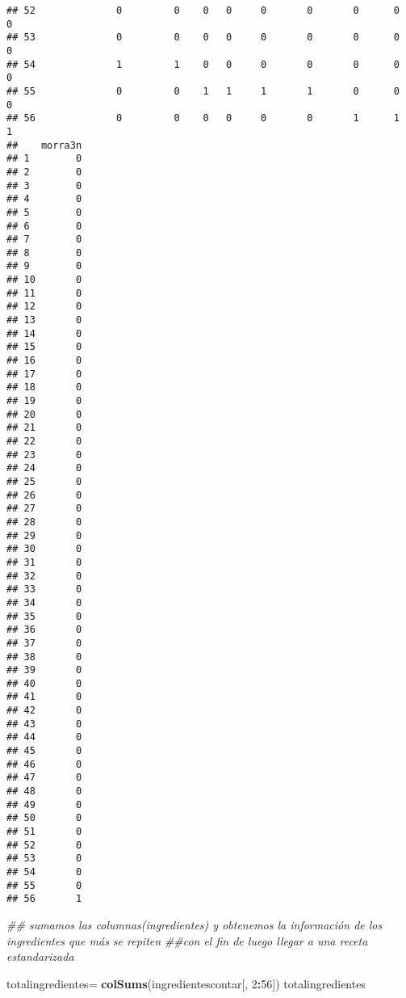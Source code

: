 \documentclass[
]{article}
\newenvironment{Shaded}{\begin{snugshade}}{\end{snugshade}}
\newcommand{\CommentTok}[1]{\textcolor[rgb]{0.56,0.35,0.01}{\textit{#1}}}
\newcommand{\DecValTok}[1]{\textcolor[rgb]{0.00,0.00,0.81}{#1}}
\newcommand{\KeywordTok}[1]{\textcolor[rgb]{0.13,0.29,0.53}{\textbf{#1}}}
\newcommand{\NormalTok}[1]{#1}
\newcommand{\OperatorTok}[1]{\textcolor[rgb]{0.81,0.36,0.00}{\textbf{#1}}}
\newcommand{\StringTok}[1]{\textcolor[rgb]{0.31,0.60,0.02}{#1}}
\begin{document}
\begin{verbatim}
## 52              0         0    0   0     0       0       0      0        0
## 53              0         0    0   0     0       0       0      0        0
## 54              1         1    0   0     0       0       0      0        0
## 55              0         0    1   1     1       1       0      0        0
## 56              0         0    0   0     0       0       1      1        1
##    morra3n
## 1        0
## 2        0
## 3        0
## 4        0
## 5        0
## 6        0
## 7        0
## 8        0
## 9        0
## 10       0
## 11       0
## 12       0
## 13       0
## 14       0
## 15       0
## 16       0
## 17       0
## 18       0
## 19       0
## 20       0
## 21       0
## 22       0
## 23       0
## 24       0
## 25       0
## 26       0
## 27       0
## 28       0
## 29       0
## 30       0
## 31       0
## 32       0
## 33       0
## 34       0
## 35       0
## 36       0
## 37       0
## 38       0
## 39       0
## 40       0
## 41       0
## 42       0
## 43       0
## 44       0
## 45       0
## 46       0
## 47       0
## 48       0
## 49       0
## 50       0
## 51       0
## 52       0
## 53       0
## 54       0
## 55       0
## 56       1
\end{verbatim}

\begin{Shaded}
\begin{Highlighting}[]
\CommentTok{## sumamos las columnas(ingredientes) y obtenemos la información de los ingredientes que más se repiten}
\CommentTok{##con el fin de luego llegar a una receta estandarizada}

\NormalTok{totalingredientes=}\StringTok{ }\KeywordTok{colSums}\NormalTok{(ingredientescontar[, }\DecValTok{2}\OperatorTok{:}\DecValTok{56}\NormalTok{])}
\NormalTok{totalingredientes}
\end{Highlighting}
\end{Shaded}
\end{document}
